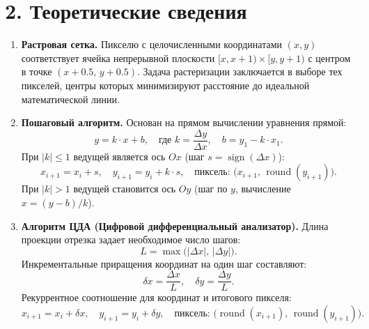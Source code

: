 \documentclass[11pt,a4paper]{article}
\begin{document}
\section*{2. Теоретические сведения}
\begin{enumerate}
    \item \textbf{Растровая сетка.} Пикселю с целочисленными координатами $(x, y)$ соответствует ячейка непрерывной плоскости $[x, x + 1) \times [y, y + 1)$ с центром в точке $(x + 0.5, \, y + 0.5)$. Задача растеризации заключается в выборе тех пикселей, центры которых минимизируют расстояние до идеальной математической линии.

    \item \textbf{Пошаговый алгоритм.} Основан на прямом вычислении уравнения прямой:
    \begin{equation}
        y = k \cdot x + b, \quad \text{где } k = \frac{\Delta y}{\Delta x}, \quad b = y_1 - k \cdot x_1.
    \end{equation}
    При $|k| \le 1$ ведущей является ось $Ox$ (шаг $s = \operatorname{sign}(\Delta x)$):
    \begin{equation}
        x_{i+1} = x_i + s, \quad y_{i+1} = y_i + k \cdot s, \quad \text{пиксель: } \bigl(x_{i+1}, \, \operatorname{round}(y_{i+1})\bigr).
    \end{equation}
    При $|k| > 1$ ведущей становится ось $Oy$ (шаг по $y$, вычисление $x = (y - b) / k$).

    \item \textbf{Алгоритм ЦДА (Цифровой дифференциальный анализатор).} Длина проекции отрезка задает необходимое число шагов:
    \begin{equation}
        L = \max\bigl(|\Delta x|, \, |\Delta y|\bigr).
    \end{equation}
    Инкрементальные приращения координат на один шаг составляют:
    \begin{equation}
        \delta x = \frac{\Delta x}{L}, \quad \delta y = \frac{\Delta y}{L}.
    \end{equation}
    Рекуррентное соотношение для координат и итогового пикселя:
    \begin{equation}
        x_{i+1} = x_i + \delta x, \quad y_{i+1} = y_i + \delta y, \quad \text{пиксель: } \bigl(\operatorname{round}(x_{i+1}), \, \operatorname{round}(y_{i+1})\bigr).
    \end{equation}


\end{enumerate}
\end{document}
